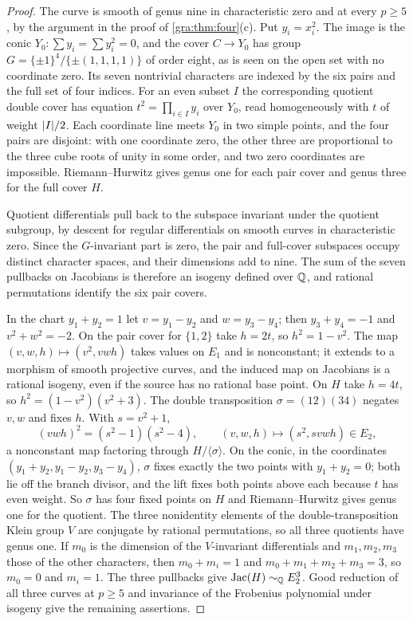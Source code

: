 \begin{proof}
The curve is smooth of genus nine in characteristic zero and at every
$p\ge5$, by the argument in the proof of \cref{gra:thm:four}(c). Put
$y_i=x_i^2$. The image is the conic $Y_0:\sum y_i=\sum y_i^2=0$, and the
cover $C\to Y_0$ has group $G=\{\pm1\}^4/\{\pm(1,1,1,1)\}$ of order eight,
as is seen on the open set with no coordinate zero. Its seven nontrivial
characters are indexed by the six pairs and the full set of four indices.
For an even subset $I$ the corresponding quotient double cover has equation
$t^2=\prod_{i\in I}y_i$ over $Y_0$, read homogeneously with $t$ of weight
$\lvert I\rvert/2$. Each coordinate line meets $Y_0$ in two simple points, and the
four pairs are disjoint: with one coordinate zero, the other three are
proportional to the three cube roots of unity in some order, and two zero
coordinates are impossible. Riemann--Hurwitz gives genus one for each pair
cover and genus three for the full cover $H$.

Quotient differentials pull back to the subspace invariant under the
quotient subgroup, by descent for regular differentials on smooth curves
in characteristic zero. Since the $G$-invariant part is zero, the pair and
full-cover subspaces occupy distinct character spaces, and their
dimensions add to nine. The sum of the seven pullbacks on Jacobians is
therefore an isogeny defined over $\mathbb{Q}$, and rational permutations identify
the six pair covers.

In the chart $y_1+y_2=1$ let $v=y_1-y_2$ and $w=y_3-y_4$; then
$y_3+y_4=-1$ and $v^2+w^2=-2$. On the pair cover for $\{1,2\}$ take $h=2t$,
so $h^2=1-v^2$. The map $(v,w,h)\mapsto(v^2,vwh)$ takes values on $E_1$ and
is nonconstant; it extends to a morphism of smooth projective curves, and
the induced map on Jacobians is a rational isogeny, even if the source has
no rational base point. On $H$ take $h=4t$, so $h^2=(1-v^2)(v^2+3)$. The
double transposition $\sigma=(12)(34)$ negates $v,w$ and fixes $h$. With
$s=v^2+1$,
\[
 (vwh)^2=(s^2-1)(s^2-4),\qquad(v,w,h)\longmapsto(s^2,svwh)\in E_2 ,
\]
a nonconstant map factoring through $H/\langle\sigma\rangle$. On the conic,
in the coordinates $(y_1+y_2,y_1-y_2,y_3-y_4)$, $\sigma$ fixes exactly the
two points with $y_1+y_2=0$; both lie off the branch divisor, and the lift
fixes both points above each because $t$ has even weight. So $\sigma$ has
four fixed points on $H$ and Riemann--Hurwitz gives genus one for the
quotient. The three nonidentity elements of the double-transposition Klein
group $V$ are conjugate by rational permutations, so all three quotients
have genus one. If $m_0$ is the dimension of the $V$-invariant
differentials and $m_1,m_2,m_3$ those of the other characters, then
$m_0+m_i=1$ and $m_0+m_1+m_2+m_3=3$, so $m_0=0$ and $m_i=1$. The three
pullbacks give $\operatorname{Jac}(H)\sim_{\mathbb{Q}} E_2^3$. Good reduction of all three curves
at $p\ge5$ and invariance of the Frobenius polynomial under isogeny give
the remaining assertions.
\end{proof}

